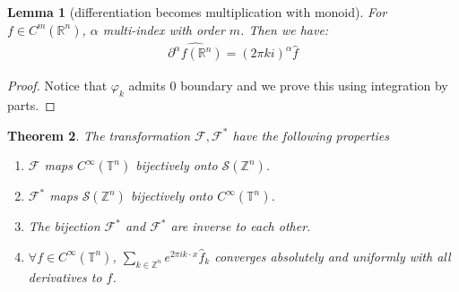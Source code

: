 \documentclass[a4paper,11pt,fleqn]{book}
\newtheorem{theorem}{Theorem}[section]
\newtheorem{lemma}[theorem]{Lemma}
\theoremstyle{definition}
\theoremstyle{remark}
\begin{document}
\begin{lemma}[differentiation becomes multiplication with monoid]
	For $f \in C^m(\mathbb{R}^n)$, $\alpha$ multi-index with order $m$. Then we have:
	\begin{align*}
		\widehat{\partial^\alpha f (\mathbb{R}^n)} = (2\pi ki)^{\alpha} \widehat{f}
	\end{align*}
\end{lemma}
\begin{proof}
	Notice that $\varphi_k$ admits 0 boundary and we prove this using integration by parts.
\end{proof}

\begin{theorem}
	The transformation $\mathcal{F}, \mathcal{F}^*$ have the following properties
	\begin{enumerate}
		\item $\mathcal{F}$ maps $C^\infty(\mathbb{T}^n)$ bijectively onto $\mathcal{S}(\mathbb{Z}^n)$.
		\item $\mathcal{F}^*$ maps $\mathcal{S}(\mathbb{Z}^n)$  bijectively onto $C^\infty(\mathbb{T}^n)$.
		\item The bijection $\mathcal{F}^*$ and $\mathcal{F}^*$ are inverse to each other.
		\item $\forall f \in C^\infty(\mathbb{T}^n)$, $\sum_{k \in \mathbb{Z}^n} e^{2\pi i k \cdot x} \hat{f}_k$ converges absolutely and uniformly with all derivatives to $f$.
	\end{enumerate}
\end{theorem}
\end{document}
